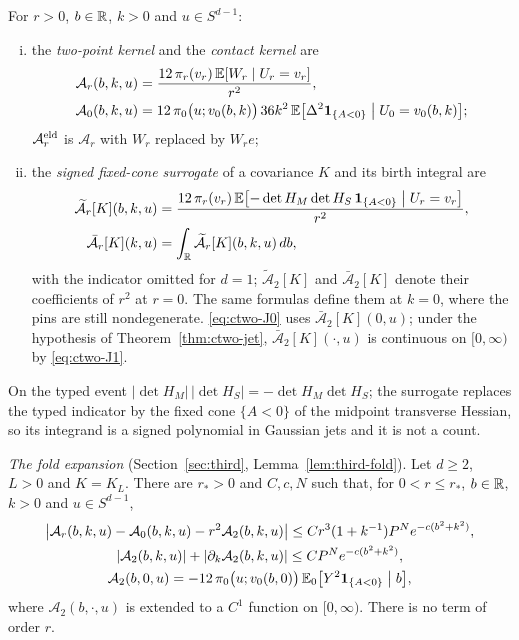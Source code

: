 \begin{definition}\label{def:ctwo-kernel}
For $r>0$, $b\in\mathbb R$, $k>0$ and $u\in S^{d-1}$:
\begin{enumerate}[(i),leftmargin=2em]
\item the \emph{two-point kernel} and the \emph{contact kernel} are
\begin{align}
\mathcal A_r(b,k,u)&=\frac{12\,\pi_r(v_r)\,\mathbb E[W_r\mid U_r=v_r]}{r^2},\label{eq:ctwo-kernel}\\
\mathcal A_0(b,k,u)&=12\,\pi_0\bigl(u;v_0(b,k)\bigr)\,36k^2\,\mathbb E\bigl[\Delta^2\mathbf 1_{\{A<0\}}\bigm|U_0=v_0(b,k)\bigr];\label{eq:ctwo-contact}
\end{align}
$\mathcal A^{\mathrm{eld}}_r$ is $\mathcal A_r$ with $W_r$ replaced by $W_re$;
\item the \emph{signed fixed-cone surrogate} of a covariance $K$ and its birth integral are
\begin{align}
\widetilde{\mathcal A}_r[K](b,k,u)&=\frac{12\,\pi_r(v_r)\,\mathbb E\bigl[-\det H_M\det H_S\,\mathbf 1_{\{A<0\}}\bigm|U_r=v_r\bigr]}{r^2},\label{eq:ctwo-surrogate}\\
\bar{\mathcal A}_r[K](k,u)&=\int_\mathbb R\widetilde{\mathcal A}_r[K](b,k,u)\,db,\label{eq:ctwo-birthint}
\end{align}
with the indicator omitted for $d=1$; $\widetilde{\mathcal A}_2[K]$ and $\bar{\mathcal A}_2[K]$ denote their coefficients of $r^2$ at $r=0$. The same formulas define them at $k=0$, where the pins are still nondegenerate. \eqref{eq:ctwo-J0} uses $\bar{\mathcal A}_2[K](0,u)$; under the hypothesis of Theorem~\ref{thm:ctwo-jet}, $\bar{\mathcal A}_2[K](\cdot,u)$ is continuous on $[0,\infty)$ by \eqref{eq:ctwo-J1}.
\end{enumerate}
\end{definition}

On the typed event $|\det H_M|\,|\det H_S|=-\det H_M\det H_S$; the surrogate replaces the typed indicator by the fixed cone $\{A<0\}$ of the midpoint transverse Hessian, so its integrand is a signed polynomial in Gaussian jets and it is not a count.

\emph{The fold expansion} (Section~\ref{sec:third}, Lemma~\ref{lem:third-fold}). Let $d\ge2$, $L>0$ and $K=K_L$. There are $r_*>0$ and $C,c,N$ such that, for $0<r\le r_*$, $b\in\mathbb R$, $k>0$ and $u\in S^{d-1}$,
\begin{equation}\label{eq:ctwo-fold}
\begin{gathered}
\bigl|\mathcal A_r(b,k,u)-\mathcal A_0(b,k,u)-r^2\mathcal A_2(b,k,u)\bigr|\le Cr^3(1+k^{-1})P^Ne^{-c(b^2+k^2)},\\
|\mathcal A_2(b,k,u)|+|\partial_k\mathcal A_2(b,k,u)|\le CP^Ne^{-c(b^2+k^2)},\\
\mathcal A_2(b,0,u)=-12\,\pi_0\bigl(u;v_0(b,0)\bigr)\,\mathbb E_0\bigl[Y^2\mathbf 1_{\{A<0\}}\bigm|b\bigr],
\end{gathered}
\end{equation}
where $\mathcal A_2(b,\cdot,u)$ is extended to a $C^1$ function on $[0,\infty)$. There is no term of order $r$.

